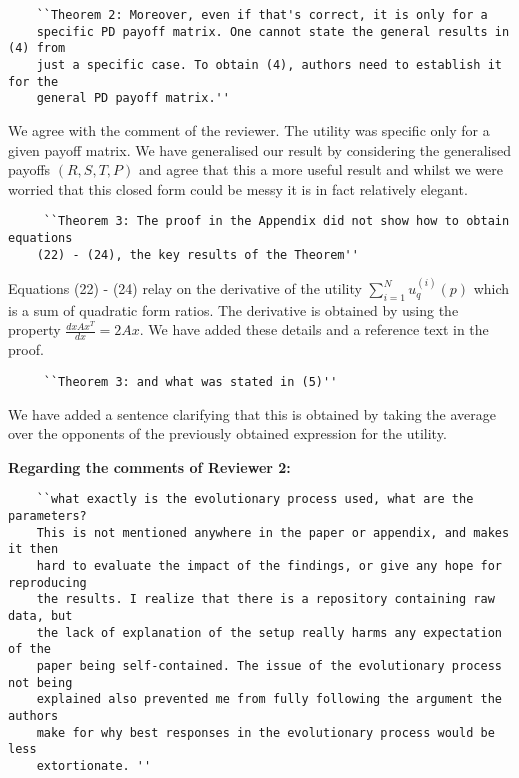 \documentclass{article}
\begin{document}
\begin{verbatim}
    ``Theorem 2: Moreover, even if that's correct, it is only for a
    specific PD payoff matrix. One cannot state the general results in (4) from
    just a specific case. To obtain (4), authors need to establish it for the
    general PD payoff matrix.''
\end{verbatim}

We agree with the comment of the reviewer. The utility was
specific only for a given payoff matrix. We have generalised our result by
considering the generalised payoffs \((R, S, T, P)\) and agree that this a more useful
result and whilst we were worried that this closed form could be messy it is in fact relatively elegant.

\begin{verbatim}
     ``Theorem 3: The proof in the Appendix did not show how to obtain equations
    (22) - (24), the key results of the Theorem''
\end{verbatim}

Equations (22) - (24) relay on the derivative of the utility \(\sum\limits_{i=1}
^ N  u_q^{(i)}(p)\) which is a sum of quadratic form ratios. The derivative is
obtained by using the property \(\frac{d x A x^T}{dx} =  2Ax\). We have added
these details and a reference text in the proof.
\begin{verbatim}
     ``Theorem 3: and what was stated in (5)''
\end{verbatim}

We have added a sentence clarifying that this is obtained by taking the average
over the opponents of the previously obtained expression for the utility.

\textbf{Regarding the comments of Reviewer 2:}

\begin{verbatim}
    ``what exactly is the evolutionary process used, what are the parameters?
    This is not mentioned anywhere in the paper or appendix, and makes it then
    hard to evaluate the impact of the findings, or give any hope for reproducing
    the results. I realize that there is a repository containing raw data, but
    the lack of explanation of the setup really harms any expectation of the
    paper being self-contained. The issue of the evolutionary process not being
    explained also prevented me from fully following the argument the authors
    make for why best responses in the evolutionary process would be less
    extortionate. ''
\end{verbatim}
\end{document}
